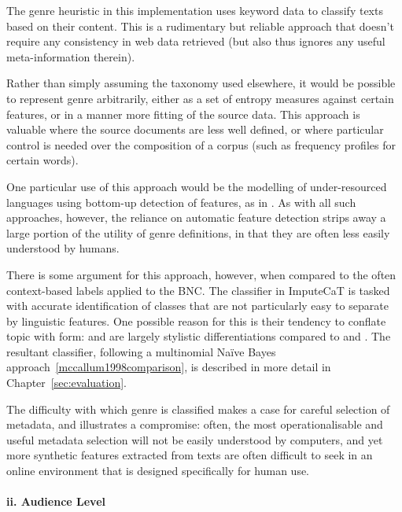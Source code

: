The genre heuristic in this implementation uses keyword data to classify texts based on their content.  This is a rudimentary but reliable approach that doesn't require any consistency in web data retrieved (but also thus ignores any useful meta-information therein).


Rather than simply assuming the taxonomy used elsewhere, it would be possible to represent genre arbitrarily, either as a set of entropy measures against certain features, or in a manner more fitting of the source data.  This approach is valuable where the source documents are less well defined, or where particular control is needed over the composition of a corpus (such as frequency profiles for certain words).

One particular use of this approach would be the modelling of under-resourced languages using bottom-up detection of features, as in \cite{sharoff2007classifying}.  As with all such approaches, however, the reliance on automatic feature detection strips away a large portion of the utility of genre definitions, in that they are often less easily understood by humans.  


There is some argument for this approach, however, when compared to the often context-based labels applied to the BNC.  The classifier in ImputeCaT is tasked with accurate identification of classes that are not particularly easy to separate by linguistic features.  One possible reason for this is their tendency to conflate topic with form:  and  are largely stylistic differentiations compared to  and .  The resultant classifier, following a multinomial Na\"ive Bayes approach~\ref{mccallum1998comparison}, is described in more detail in Chapter~\ref{sec:evaluation}.


The difficulty with which genre is classified makes a case for careful selection of metadata, and illustrates a compromise: often, the most operationalisable and useful metadata selection will not be easily understood by computers, and yet more synthetic features extracted from texts are often difficult to seek in an online environment that is designed specifically for human use.


\paragraph{ii. Audience Level}

